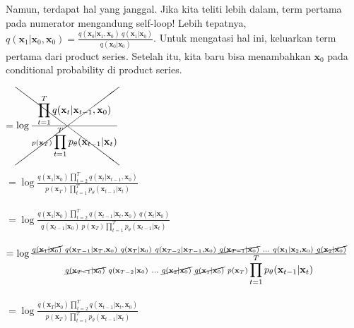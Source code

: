\documentclass{article}
\begin{document}
Namun, terdapat hal yang janggal. Jika kita teliti lebih dalam, term pertama pada numerator mengandung self-loop! Lebih tepatnya, $ q(\textbf{x}_1|\textbf{x}_0,\textbf{x}_0) = \frac{q(\textbf{x}_0|\textbf{x}_1,\textbf{x}_0) \ q(\textbf{x}_1|\textbf{x}_0) }{ q(\textbf{x}_0|\textbf{x}_0) } $. Untuk mengatasi hal ini, keluarkan term pertama dari product series. Setelah itu, kita baru bisa menambahkan $ \textbf{x}_0 $ pada conditional probability di product series.
\begin{tabbing}
\hspace{6em} $ =\xcancel{ \log \frac{\displaystyle \prod_{t=1}^{T} q(\textbf{x}_{t}|\textbf{x}_{t-1},\textbf{x}_0) } { p(\textbf{x}_T) \displaystyle \prod_{t=1}^{T} p_\theta(\textbf{x}_{t-1}|\textbf{x}_{t})} } $\\\\

\hspace{6em} $ = \log \frac{q(\textbf{x}_1|\textbf{x}_0) \displaystyle \prod_{t=2}^{T} q(\textbf{x}_{t}|\textbf{x}_{t-1},\textbf{x}_0) } { p(\textbf{x}_T) \displaystyle \prod_{t=1}^{T} p_\theta(\textbf{x}_{t-1}|\textbf{x}_{t})} $\\\\

\hspace{6em} $ = \log \frac{q(\textbf{x}_1|\textbf{x}_0) \displaystyle \prod_{t=2}^{T} q(\textbf{x}_{t-1}|\textbf{x}_t,\textbf{x}_0) \ q(\textbf{x}_{t}|\textbf{x}_0) } { q(\textbf{x}_{t-1}|\textbf{x}_0) \ p(\textbf{x}_T) \displaystyle \prod_{t=1}^{T} p_\theta(\textbf{x}_{t-1}|\textbf{x}_{t})} $\\\\

\hspace{6em} $ = \log \frac{ 
\cancel{q(\textbf{x}_1|\textbf{x}_0)}
\ q(\textbf{x}_{T-1}|\textbf{x}_T,\textbf{x}_0) \ q(\textbf{x}_T|\textbf{x}_0) 
\ q(\textbf{x}_{T-2}|\textbf{x}_{T-1},\textbf{x}_0) \ \cancel{q(\textbf{x}_{T-1}|\textbf{x}_0)} 
\ ...
\ q(\textbf{x}_{1}|\textbf{x}_{2},\textbf{x}_0) \ \cancel{q(\textbf{x}_{2}|\textbf{x}_0)} 
} 
{ 
\cancel{q(\textbf{x}_{T-1}|\textbf{x}_0)} 
\ q(\textbf{x}_{T-2}|\textbf{x}_0)
\ ...
\ \cancel{q(\textbf{x}_{2}|\textbf{x}_0)}
\ \cancel{q(\textbf{x}_{1}|\textbf{x}_0)}
\ p(\textbf{x}_T) \displaystyle \prod_{t=1}^{T} p_\theta(\textbf{x}_{t-1}|\textbf{x}_{t}) } $\\\\

\hspace{6em} $ = \log \frac{
q(\textbf{x}_T|\textbf{x}_0) \displaystyle \prod_{t=2}^{T} q(\textbf{x}_{t-1}|\textbf{x}_t,\textbf{x}_0)
} 
{ 
p(\textbf{x}_T) \displaystyle \prod_{t=1}^{T} p_\theta(\textbf{x}_{t-1}|\textbf{x}_{t})
} $\\\\


\end{tabbing}
\end{document}
